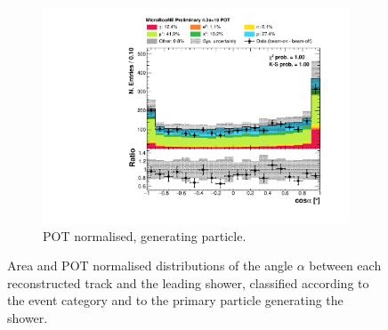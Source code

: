 \begin{figure}[htbp]
\begin{subfigure}{0.49\textwidth}
    \includegraphics[width=\linewidth]{figures/h_track_shower_angle_pdg.pdf}
    \caption{POT normalised, generating particle.} \label{fig:angle_pdg}
  \end{subfigure}
  \caption{Area and POT normalised distributions of the angle $\alpha$ between each reconstructed track and the leading shower, classified according to the event category and to the primary particle generating the shower.}
\end{figure}


